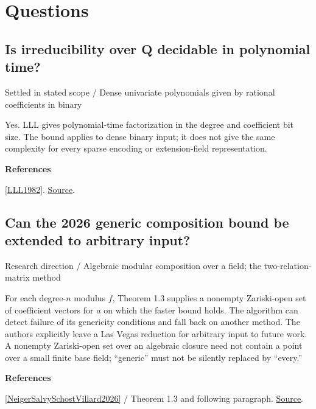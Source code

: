 \documentclass[11pt,a4paper,oneside,openany]{book}
\newenvironment{sources}{\par\smallskip\begingroup\footnotesize\color{atlasgray}\leftskip=10pt\setlength{\parskip}{2pt}}{\par\endgroup\smallskip}
\begin{document}
\section*{Questions}
\subsection*{Is irreducibility over Q decidable in polynomial time?}
{\small\sffamily\color{atlasgold}Settled in stated scope / Dense univariate polynomials given by rational coefficients in binary}\par\smallskip
\color{black} Yes. LLL gives polynomial-time factorization in the degree and coefficient bit size. The bound applies to dense binary input; it does not give the same complexity for every sparse encoding or extension-field representation.\par
\begin{sources}
\textbf{References}\par\smallskip
\noindent\hyperlink{ref:LLL1982}{[LLL1982]}.  \href{https://doi.org/10.1007/BF01457454}{Source}.\par
\end{sources}\color{black}
\subsection*{Can the 2026 generic composition bound be extended to arbitrary input?}
{\small\sffamily\color{atlasgold}Research direction / Algebraic modular composition over a field; the two-relation-matrix method}\par\smallskip
\color{black} For each degree-\(n\) modulus \(f\), Theorem 1.3 supplies a nonempty Zariski-open set of coefficient vectors for \(a\) on which the faster bound holds. The algorithm can detect failure of its genericity conditions and fall back on another method. The authors explicitly leave a Las Vegas reduction for arbitrary input to future work. A nonempty Zariski-open set over an algebraic closure need not contain a point over a small finite base field; ``generic'' must not be silently replaced by ``every.''\par
\begin{sources}
\textbf{References}\par\smallskip
\noindent\hyperlink{ref:NeigerSalvySchostVillard2026}{[NeigerSalvySchostVillard2026]} / Theorem 1.3 and following paragraph.  \href{https://doi.org/10.1145/3815436.3815451}{Source}.\par
\end{sources}\color{black}
\end{document}

